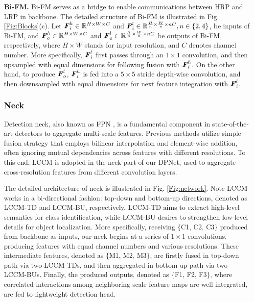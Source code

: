 \documentclass[lettersize,journal]{IEEEtran}
\begin{document}
\noindent \textbf{Bi-FM.} Bi-FM serves as a bridge to enable communications between HRP and LRP in backbone. The detailed structure of Bi-FM is illustrated in Fig. \ref{Fig:Blocks}(c). Let $\textbf{\emph{F}}_{i}^{h} \in \mathbb{R}^{H \times W \times C}$ and $\textbf{\emph{F}}_{i}^{l} \in \mathbb{R}^{\frac{H}{n} \times \frac{W}{n} \times nC}, n \in \{2,4\}$, be inputs of Bi-FM, and $\textbf{\emph{F}}_{o}^{h} \in \mathbb{R}^{H \times W \times C}$ and $\textbf{\emph{F}}_{o}^{l} \in \mathbb{R}^{\frac{H}{n} \times \frac{W}{n} \times nC}$ be outputs of Bi-FM, respectively, where $H \times W$ stands for input resolution, and $C$ denotes channel number. More specifically, $\textbf{\emph{F}}_{i}^{l}$ first passes through an $1 \times 1$ convolution, and then upsampled with equal dimensions for following fusion with $\textbf{\emph{F}}_{i}^{h}$. On the other hand, to produce $\textbf{\emph{F}}_{o}^{l}$, $\textbf{\emph{F}}_{i}^{h}$ is fed into a $5\times5$ stride depth-wise convolution, and then downsampled with equal dimensions for next feature integration with $\textbf{\emph{F}}_{i}^{l}$.

\subsubsection{Neck}

Detection neck, also known as FPN \cite{lin2017feature}, is a fundamental component in state-of-the-art detectors to aggregate multi-scale features. Previous methods \cite{lin2017feature,liu2018path} utilize simple fusion strategy that employs bilinear interpolation and element-wise addition, often ignoring mutual dependencies across features with different resolutions. To this end, LCCM is adopted in the neck part of our DPNet, used to aggregate cross-resolution features from different convolution layers.

The detailed architecture of neck is illustrated in Fig. \ref{Fig:network}. Note LCCM works in a bi-directional fashion: top-down and bottom-up directions, denoted as LCCM-TD and LCCM-BU, respectively. LCCM-TD aims to extract high-level semantics for class identification, while LCCM-BU desires to strengthen low-level details for object localization. More specifically, receiving $\lbrace$C1, C2, C3$\rbrace$ produced from backbone as inputs, our neck begins at a series of $1 \times 1$ convolutions, producing features with equal channel numbers and various resolutions. These intermediate features, denoted as $\lbrace$M1, M2, M3$\rbrace$, are firstly fused in top-down path via two LCCM-TDs, and then aggregated in bottom-up path via two LCCM-BUs. Finally, the produced outputs, denoted as $\lbrace$F1, F2, F3$\rbrace$, where correlated interactions among neighboring scale feature maps are well integrated, are fed to lightweight detection head.
\end{document}
